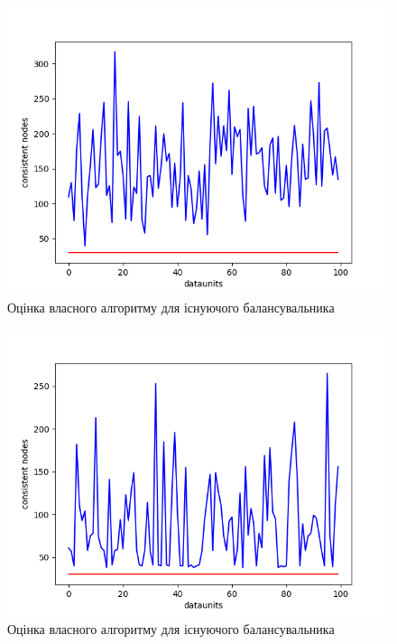 \documentclass[14pt]{vakthesis}
\begin{document}
\begin{figure}
\centering

\includegraphics[width=\linewidth]{images/lb_custom/w_3000_r_500.png}

     \caption{Оцінка власного алгоритму для існуючого балансувальника}
     \label{fig:lb_custom_3000}
\end{figure}

\begin{figure}
\centering

\includegraphics[width=\linewidth]{images/lb_custom/w_5000_r_500.png}

     \caption{Оцінка власного алгоритму для існуючого балансувальника}
     \label{fig:lb_custom_5000}
\end{figure}
\end{document}
